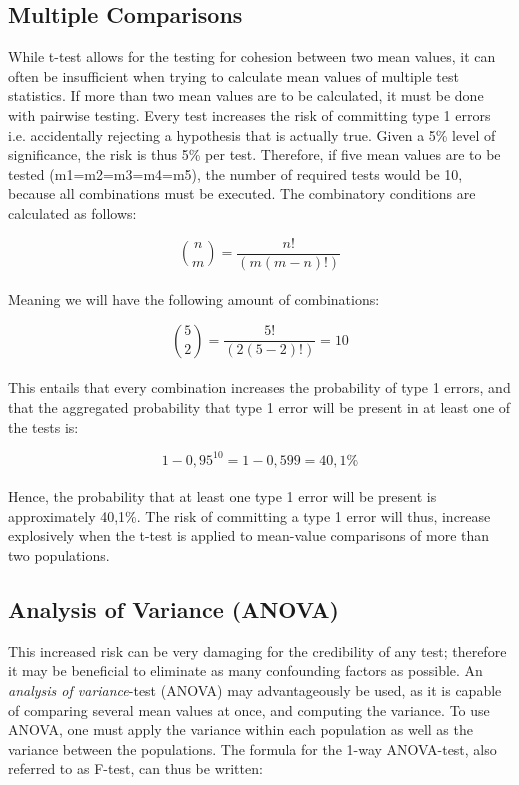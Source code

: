 \subsection{Multiple Comparisons}
While t-test allows for the testing for cohesion between two mean values, it can often be insufficient when trying to calculate mean values of multiple test statistics. If more than two mean values are to be calculated, it must be done with pairwise testing. Every test increases the risk of committing type 1 errors i.e. accidentally rejecting a hypothesis that is actually true. Given a 5\% level of significance, the risk is thus 5\% per test. Therefore, if five mean values are to be tested (m1=m2=m3=m4=m5), the number of required tests would be 10, because all combinations must be executed. The combinatory conditions are calculated as follows:

\begin{equation}
\binom{n}{m} = {\frac{n!}{(m(m-n)!)}} 
\end{equation}\\
Meaning we will have the following amount of combinations:

\begin{equation}
\binom{5}{2} = {\frac{5!}{(2(5-2)!)}} = 10 
\end{equation}\\
This entails that every combination increases the probability of type 1 errors, and that the aggregated probability that type 1 error will be present in at least one of the tests is:

\begin{equation}
1-0,95^{10}= 1-0,599 = 40,1\%
\end{equation}\\
Hence, the probability  that at least one type 1 error will be present is approximately 40,1\%. The risk of committing a type 1 error will thus, increase explosively when the t-test is applied to mean-value comparisons of more than two populations.
\\

\subsection{Analysis of Variance (ANOVA)}
This increased risk can be very damaging for the credibility of any test; therefore it may be beneficial to eliminate as many confounding factors as possible. An \textit{analysis of variance}-test (ANOVA) may advantageously be used, as it is capable of comparing several mean values at once, and computing the variance.  To use ANOVA, one must apply the variance within each population as well as the variance between the populations. The formula for the 1-way ANOVA-test, also referred to as F-test, can thus be written:\\

